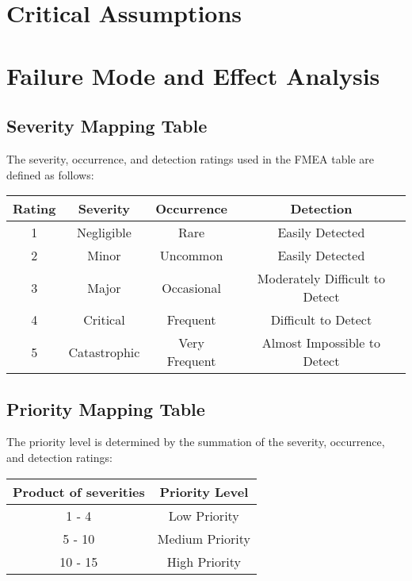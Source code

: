 \documentclass{article}
\begin{document}
\section{Critical Assumptions}


\section{Failure Mode and Effect Analysis}

\subsection{Severity Mapping Table}
The severity, occurrence, and detection ratings used in the FMEA table are defined as follows:
\begin{table}[H]
\begin{tabular}{c|c|c|c}

    Rating & Severity & Occurrence & Detection \\\hline
    1 & Negligible & Rare & Easily Detected \\\hline
    2 & Minor & Uncommon & Easily Detected \\ \hline
    3 & Major & Occasional & Moderately Difficult to Detect \\\hline
    4 & Critical & Frequent & Difficult to Detect \\\hline
    5 & Catastrophic & Very Frequent & Almost Impossible to Detect \\


\end{tabular}
\end{table}

\subsection{Priority Mapping Table}

The priority level is determined by the summation of the severity, occurrence,
and detection ratings:

\begin{table}[H]
    \begin{tabular}{c|c}
        Product of severities & Priority Level \\\hline
        1 - 4 & Low Priority \\\hline
        5 - 10 & Medium Priority \\\hline
        10 - 15 & High Priority \\

    \end{tabular}
\end{table}
\end{document}
